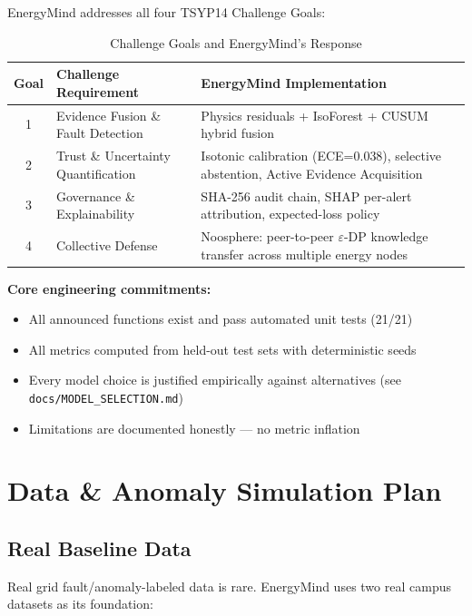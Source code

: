 \documentclass[12pt, a4paper]{article}
\begin{document}
EnergyMind addresses all four TSYP14 Challenge Goals:

\begin{table}[H]
\centering
\caption{Challenge Goals and EnergyMind's Response}
\begin{tabularx}{\linewidth}{clX}
\toprule
\textbf{Goal} & \textbf{Challenge Requirement} & \textbf{EnergyMind Implementation}\\
\midrule
1 & Evidence Fusion \& Fault Detection & Physics residuals + IsoForest + CUSUM hybrid fusion\\
2 & Trust \& Uncertainty Quantification & Isotonic calibration (ECE=0.038), selective abstention, Active Evidence Acquisition\\
3 & Governance \& Explainability & SHA-256 audit chain, SHAP per-alert attribution, expected-loss policy\\
4 & Collective Defense & Noosphere: peer-to-peer $\varepsilon$-DP knowledge transfer across multiple energy nodes\\
\bottomrule
\end{tabularx}
\end{table}

\textbf{Core engineering commitments:}
\begin{itemize}
  \item All announced functions exist and pass automated unit tests (21/21)
  \item All metrics computed from held-out test sets with deterministic seeds
  \item Every model choice is justified empirically against alternatives (see \texttt{docs/\allowbreak{}MODEL\_SELECTION.md})
  \item Limitations are documented honestly — no metric inflation
\end{itemize}

\section{Data \& Anomaly Simulation Plan}

\subsection{Real Baseline Data}

Real grid fault/anomaly-labeled data is rare. EnergyMind uses two real campus datasets as its foundation:
\end{document}
